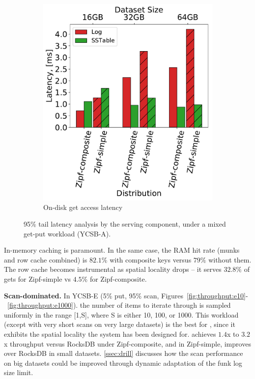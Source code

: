 \begin{figure}[htb]
\begin{subfigure}{0.49\linewidth}
\includegraphics[width=\textwidth]{figs/Latency_A.pdf}
\caption{On-disk get access latency}
\label{fig:readstat:lat}
\end{subfigure}
\caption{{\sys\/ 95\% tail latency analysis by the serving component, under a mixed get-put workload (YCSB-A).}}
\label{fig:readstat}
\end{figure}

In-memory caching is paramount. In the same case, the RAM hit rate 
(munks and row cache combined) is $82.1\%$ with composite keys versus $79\%$ without them. 
The row cache becomes instrumental as spatial locality drops -- it serves $32.8\%$ of gets for Zipf-simple 
vs $4.5\%$ for Zipf-composite. 

{\bf Scan-dominated.} In YCSB-E (5\% put, 95\% scan, Figures~\ref{fig:throughput:e10}-~\ref{fig:throughput:e1000}).
the number of items to iterate through is  
sampled uniformly in the range [1,S], where S is either 10, 100, or 1000. 
This workload (except with very short scans on very large datasets) is the best for \sys, since it exhibits the spatial locality the system has been designed for. 
\sys\/ achieves $1.4$x to $3.2$x throughput versus RocksDB under Zipf-composite, and in Zipf-simple, improves over RocksDB in small datasets. 
\cref{ssec:drill} discusses how the scan performance on big datasets could be improved through dynamic adaptation of the 
funk log size limit.
 
